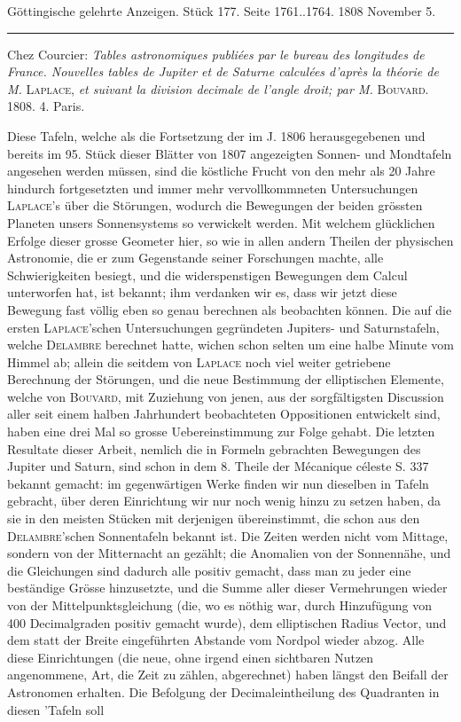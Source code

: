\clearpage
{}
\begin{center}\small Göttingische gelehrte Anzeigen. Stück 177. Seite 1761..1764. 1808 November 5.\\[3pt]\rule{.72\linewidth}{.3pt}\end{center}

Chez Courcier: \emph{Tables astronomiques publiées par le bureau des longitudes de France. Nouvelles tables de Jupiter et de Saturne calculées d'après la théorie de M. }\textsc{Laplace}, \emph{et suivant la division decimale de l'angle droit; par M.} \textsc{Bouvard}. 1808. 4. Paris.

Diese Tafeln, welche als die Fortsetzung der im J. 1806 herausgegebenen und bereits im 95. Stück dieser Blätter von 1807 angezeigten Sonnen- und Mondtafeln angesehen werden müssen, sind die köstliche Frucht von den mehr als 20 Jahre hindurch fortgesetzten und immer mehr vervollkommneten Untersuchungen \textsc{Laplace}'s über die Störungen, wodurch die Bewegungen der beiden grössten Planeten unsers Sonnensystems so verwickelt werden. Mit welchem glücklichen Erfolge dieser grosse Geometer hier, so wie in allen andern Theilen der physischen Astronomie, die er zum Gegenstande seiner Forschungen machte, alle Schwierigkeiten besiegt, und die widerspenstigen Bewegungen dem Calcul unterworfen hat, ist bekannt; ihm verdanken wir es, dass wir jetzt diese Bewegung fast völlig eben so genau berechnen als beobachten können. Die auf die ersten \textsc{Laplace}'schen Untersuchungen gegründeten Jupiters- und Saturnstafeln, welche \textsc{Delambre} berechnet hatte, wichen schon selten um eine halbe Minute vom Himmel ab; allein die seitdem von \textsc{Laplace} noch viel weiter getriebene Berechnung der Störungen, und die neue Bestimmung der elliptischen Elemente, welche von \textsc{Bouvard}, mit Zuziehung von jenen, aus der sorgfältigsten Discussion aller seit einem halben Jahrhundert beobachteten Oppositionen entwickelt sind, haben eine drei Mal so grosse Uebereinstimmung zur Folge gehabt. Die letzten Resultate dieser Arbeit, nemlich die in Formeln gebrachten Bewegungen des Jupiter und Saturn, sind schon in dem 8. Theile der Mécanique céleste S. 337 bekannt gemacht: im gegenwärtigen Werke finden wir nun dieselben in Tafeln gebracht, über deren Einrichtung wir nur noch wenig hinzu zu setzen haben, da sie in den meisten Stücken mit derjenigen übereinstimmt, die schon aus den \textsc{Delambre}'schen Sonnentafeln bekannt ist. Die Zeiten werden nicht vom Mittage, sondern von der Mitternacht an gezählt; die Anomalien von der Sonnennähe, und die Gleichungen sind dadurch alle positiv gemacht, dass man zu jeder eine beständige Grösse hinzusetzte, und die Summe aller dieser Vermehrungen wieder von der Mittelpunktsgleichung (die, wo es nöthig war, durch Hinzufügung von 400 Decimalgraden positiv gemacht wurde), dem elliptischen Radius Vector, und dem statt der Breite eingeführten Abstande vom Nordpol wieder abzog. Alle diese Einrichtungen (die neue, ohne irgend einen sichtbaren Nutzen angenommene, Art, die Zeit zu zählen, abgerechnet) haben längst den Beifall der Astronomen erhalten. Die Befolgung der Decimaleintheilung des Quadranten in diesen 'Tafeln soll 